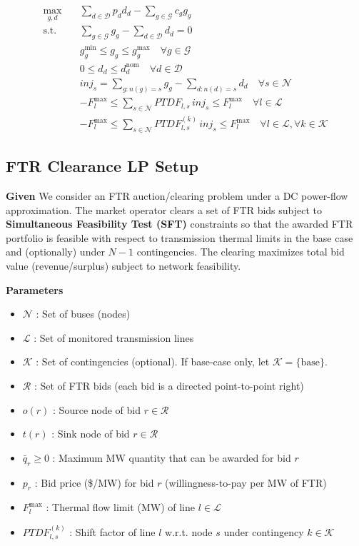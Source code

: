 \documentclass[11pt]{article}
\begin{document}
\begin{align}
\max_{g,d} \quad
& \sum_{d \in \mathcal{D}} p_d d_d
- \sum_{g \in \mathcal{G}} c_g g_g
\\[6pt]
\text{s.t.} \quad
& \sum_{g \in \mathcal{G}} g_g
-
\sum_{d \in \mathcal{D}} d_d
= 0
\\[6pt]
& g_g^{\min} \le g_g \le g_g^{\max}
\quad \forall g \in \mathcal{G}
\\[6pt]
& 0 \le d_d \le d_d^{\text{nom}}
\quad \forall d \in \mathcal{D}
\\[6pt]
& inj_s =
\sum_{g: n(g)=s} g_g
-
\sum_{d: n(d)=s} d_d
\quad \forall s \in \mathcal{N}
\\[6pt]
& -F_l^{\max}
\le
\sum_{s \in \mathcal{N}} PTDF_{l,s}\,inj_s
\le
F_l^{\max}
\quad \forall l \in \mathcal{L}
\\[6pt]
& -F_l^{\max}
\le
\sum_{s \in \mathcal{N}} PTDF_{l,s}^{(k)}\,inj_s
\le
F_l^{\max}
\quad \forall l \in \mathcal{L}, \forall k \in \mathcal{K}
\end{align}

\subsection{FTR Clearance LP Setup}

\textbf{Given}
We consider an FTR auction/clearing problem under a DC power-flow approximation.
The market operator clears a set of FTR bids subject to \textbf{Simultaneous Feasibility Test (SFT)}
constraints so that the awarded FTR portfolio is feasible with respect to transmission thermal limits
in the base case and (optionally) under $N\!-\!1$ contingencies. The clearing maximizes total bid value
(revenue/surplus) subject to network feasibility.

\textbf{Parameters}
\begin{itemize}
  \item $\mathcal{N}$ : Set of buses (nodes)
  \item $\mathcal{L}$ : Set of monitored transmission lines
  \item $\mathcal{K}$ : Set of contingencies (optional). If base-case only, let $\mathcal{K}=\{\text{base}\}$.
  \item $\mathcal{R}$ : Set of FTR bids (each bid is a directed point-to-point right)
  \item $o(r)$ : Source node of bid $r\in\mathcal{R}$
  \item $t(r)$ : Sink node of bid $r\in\mathcal{R}$
  \item $\bar q_r \ge 0$ : Maximum MW quantity that can be awarded for bid $r$
  \item $p_r$ : Bid price (\$/MW) for bid $r$ (willingness-to-pay per MW of FTR)
  \item $F_l^{\max}$ : Thermal flow limit (MW) of line $l\in\mathcal{L}$
  \item $PTDF^{(k)}_{l,s}$ : Shift factor of line $l$ w.r.t. node $s$ under contingency $k\in\mathcal{K}$

\end{itemize}
\end{document}
